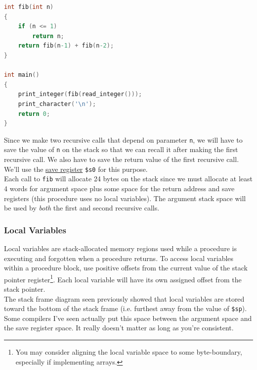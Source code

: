 \documentclass[12pt]{article}
\begin{document}
\begin{lstlisting}[language=C]
int fib(int n)
{
    if (n <= 1)
        return n;
    return fib(n-1) + fib(n-2);
}

int main()
{
    print_integer(fib(read_integer()));
    print_character('\n');
    return 0;
}
\end{lstlisting}

Since we make two recursive calls that depend on parameter \texttt{n}, we will
     have to save the value of \texttt{n} on the stack so that we can recall it
     after making the first recursive call. We also have to save the return
     value of the first recursive call. We'll use the
     \hyperref[sec:saveregs]{save register} \texttt{\$s0} for this purpose.\\

Each call to \texttt{fib} will allocate 24 bytes on the stack since we must
     allocate at least 4 words for argument space plus some space for the return
     address and save registers (this procedure uses no local variables). The
     argument stack space will be used by \textit{both} the first and second
     recursive calls.\\



\newpage
\subsubsection{Local Variables}

Local variables are stack-allocated memory regions used while a procedure is
     executing and forgotten when a procedure returns. To access local variables
     within a procedure block, use positive offsets from the current value of
     the stack pointer register\footnote{You may consider aligning the local
     variable space to some byte-boundary, especially if implementing
     arrays.}. Each local variable will have its own assigned offset from the
     stack pointer.\\

The stack frame diagram seen previously showed that local variables are stored
     toward the bottom of the stack frame (i.e. furthest away from the value of
     \texttt{\$sp}). Some compilers I've seen actually put this space between the
     argument space and the save register space. It really doesn't matter as
     long as you're consistent.\\
\end{document}
